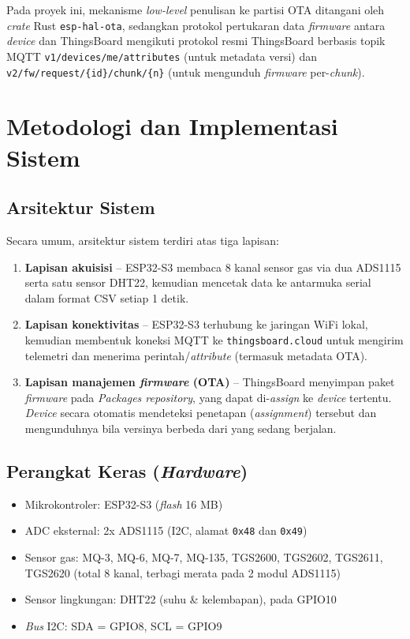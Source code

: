 \documentclass[12pt,a4paper]{report}
\begin{document}
Pada proyek ini, mekanisme \textit{low-level} penulisan ke partisi OTA ditangani oleh
\textit{crate} Rust \texttt{esp-hal-ota}, sedangkan protokol pertukaran data \textit{firmware}
antara \textit{device} dan ThingsBoard mengikuti protokol resmi ThingsBoard berbasis topik MQTT
\texttt{v1/devices/me/attributes} (untuk metadata versi) dan
\texttt{v2/fw/request/\{id\}/chunk/\{n\}} (untuk mengunduh \textit{firmware} per-\textit{chunk}).

\chapter{Metodologi dan Implementasi Sistem}

\section{Arsitektur Sistem}
Secara umum, arsitektur sistem terdiri atas tiga lapisan:
\begin{enumerate}[label=\arabic*.]
    \item \textbf{Lapisan akuisisi} -- ESP32-S3 membaca 8 kanal sensor gas via dua
    ADS1115 serta satu sensor DHT22, kemudian mencetak data ke antarmuka serial dalam
    format CSV setiap 1 detik.
    \item \textbf{Lapisan konektivitas} -- ESP32-S3 terhubung ke jaringan WiFi lokal,
    kemudian membentuk koneksi MQTT ke \texttt{thingsboard.cloud} untuk mengirim
    telemetri dan menerima perintah/\textit{attribute} (termasuk metadata OTA).
    \item \textbf{Lapisan manajemen \textit{firmware} (OTA)} -- ThingsBoard menyimpan paket
    \textit{firmware} pada \textit{Packages repository}, yang dapat di-\textit{assign} ke
    \textit{device} tertentu. \textit{Device} secara otomatis mendeteksi penetapan (\textit{assignment})
    tersebut dan mengunduhnya bila versinya berbeda dari yang sedang berjalan.
\end{enumerate}

\section{Perangkat Keras (\textit{Hardware})}
\begin{itemize}
    \item Mikrokontroler: ESP32-S3 (\textit{flash} 16 MB)
    \item ADC eksternal: 2x ADS1115 (I2C, alamat \texttt{0x48} dan \texttt{0x49})
    \item Sensor gas: MQ-3, MQ-6, MQ-7, MQ-135, TGS2600, TGS2602, TGS2611, TGS2620
    (total 8 kanal, terbagi merata pada 2 modul ADS1115)
    \item Sensor lingkungan: DHT22 (suhu \& kelembapan), pada GPIO10
    \item \textit{Bus} I2C: SDA = GPIO8, SCL = GPIO9
\end{itemize}
\end{document}
